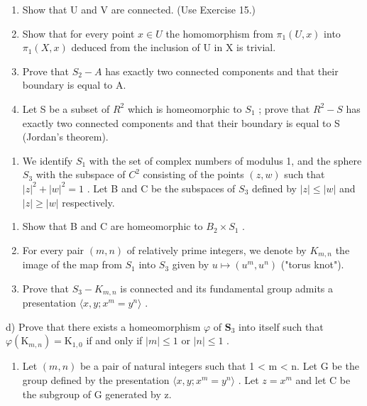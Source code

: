 \begin{enumerate}
\def\labelenumi{\alph{enumi})}
\item
  Show that U and V are connected. (Use Exercise 15.)
\item
  Show that for every point \(x \in U\) the homomorphism from \(\pi_{1}(U, x)\) into \(\pi_{1}(X, x)\) deduced from the inclusion of U in X is trivial.
\item
  Prove that \(S_{2}-A\) has exactly two connected components and that their boundary is equal to A.
\item
  Let S be a subset of \(R^{2}\) which is homeomorphic to \(S_{1}\) ; prove that \(R^{2}-S\) has exactly two connected components and that their boundary is equal to S (Jordan's theorem).
\end{enumerate}

\begin{enumerate}
\def\labelenumi{\arabic{enumi})}
\setcounter{enumi}{16}
\tightlist
\item
  We identify \(S_{1}\) with the set of complex numbers of modulus 1, and the sphere \(S_{3}\) with the subspace of \(C^{2}\) consisting of the points \((z,w)\) such that \(|z|^{2} + |w|^{2} = 1\) . Let B and C be the subspaces of \(S_{3}\) defined by \(|z| \leqslant |w|\) and \(|z| \geqslant |w|\) respectively.
\end{enumerate}

\begin{enumerate}
\def\labelenumi{\alph{enumi})}
\item
  Show that B and C are homeomorphic to \(B_{2} \times S_{1}\) .
\item
  For every pair \((m,n)\) of relatively prime integers, we denote by \(K_{m,n}\) the image of the map from \(S_{1}\) into \(S_{3}\) given by \(u\mapsto(u^{m},u^{n})\) ("torus knot").
\item
  Prove that \(S_{3}-K_{m,n}\) is connected and its fundamental group admits a presentation \(\langle x,y;x^{m}=y^{n}\rangle\) .
\end{enumerate}

d) Prove that there exists a homeomorphism \(\varphi\) of \(\mathbf{S}_3\) into itself such that \(\varphi(\mathrm{K}_{m,n}) = \mathrm{K}_{1,0}\) if and only if \(|m| \leqslant 1\) or \(|n| \leqslant 1\) .

\begin{enumerate}
\def\labelenumi{\arabic{enumi})}
\setcounter{enumi}{17}
\tightlist
\item
  Let \((m,n)\) be a pair of natural integers such that 1 \textless{} m \textless{} n. Let G be the group defined by the presentation \(\langle x,y;x^{m}=y^{n}\rangle\) . Let \(z=x^{m}\) and let C be the subgroup of G generated by z.
\end{enumerate}

